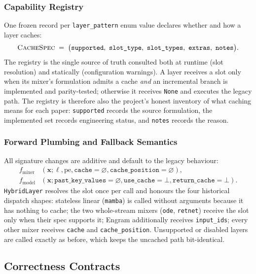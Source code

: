 \subsubsection{Capability Registry}

One frozen record per \texttt{layer\_pattern} enum value declares whether and how a layer caches:
\[
\textsc{CacheSpec} \;=\; \big(\texttt{supported},\ \texttt{slot\_type},\ \texttt{slot\_types},\ \texttt{extras},\ \texttt{notes}\big).
\]
The registry is the single source of truth consulted both at runtime (slot resolution) and statically (configuration warnings). A layer receives a slot only when its mixer's formulation admits a cache \emph{and} an incremental branch is implemented and parity-tested; otherwise it receives \texttt{None} and executes the legacy path. The registry is therefore also the project's honest inventory of what caching means for each paper: \texttt{supported} records the source formulation, the implemented set records engineering status, and \texttt{notes} records the reason.

\subsubsection{Forward Plumbing and Fallback Semantics}

All signature changes are additive and default to the legacy behaviour:
\begin{align*}
f_{\text{mixer}}&(\mathbf{x}; \ell, \text{pe}, \texttt{cache}=\varnothing, \texttt{cache\_position}=\varnothing),\\
f_{\text{model}}&(\mathbf{x}; \texttt{past\_key\_values}=\varnothing, \texttt{use\_cache}=\bot, \texttt{return\_cache}=\bot).
\end{align*}
\texttt{HybridLayer} resolves the slot once per call and honours the four historical dispatch shapes: stateless linear (\texttt{mamba}) is called without arguments because it has nothing to cache; the two whole-stream mixers (\texttt{ode}, \texttt{retnet}) receive the slot only when their spec supports it; Engram additionally receives \texttt{input\_ids}; every other mixer receives \texttt{cache} and \texttt{cache\_position}. Unsupported or disabled layers are called exactly as before, which keeps the uncached path bit-identical.

\subsection{Correctness Contracts}
\label{sec:kv-correctness}

